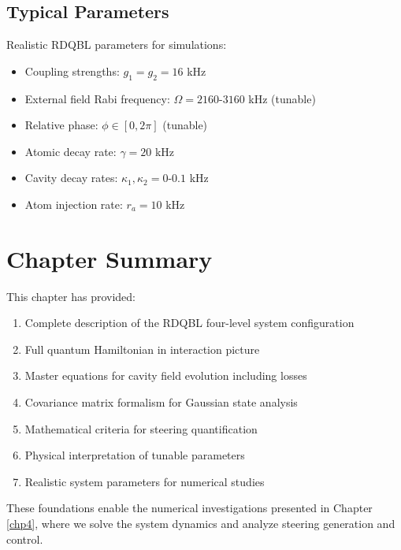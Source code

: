 \subsection{Typical Parameters}

Realistic RDQBL parameters for simulations:
\begin{itemize}
	\item Coupling strengths: $g_1 = g_2 = 16$ kHz
	\item External field Rabi frequency: $\Omega = 2160$-$3160$ kHz (tunable)
	\item Relative phase: $\phi \in [0, 2\pi]$ (tunable)
	\item Atomic decay rate: $\gamma = 20$ kHz
	\item Cavity decay rates: $\kappa_1, \kappa_2 = 0$-$0.1$ kHz
	\item Atom injection rate: $r_a = 10$ kHz
\end{itemize}

\section{Chapter Summary}

This chapter has provided:
\begin{enumerate}
	\item Complete description of the RDQBL four-level system configuration
	\item Full quantum Hamiltonian in interaction picture
	\item Master equations for cavity field evolution including losses
	\item Covariance matrix formalism for Gaussian state analysis
	\item Mathematical criteria for steering quantification
	\item Physical interpretation of tunable parameters
	\item Realistic system parameters for numerical studies
\end{enumerate}

These foundations enable the numerical investigations presented in Chapter \ref{chp4}, where we solve the system dynamics and analyze steering generation and control.

